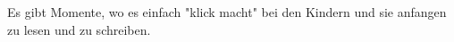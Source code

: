 Es gibt Momente, wo es einfach "klick macht" bei den Kindern und sie anfangen zu lesen und zu schreiben.